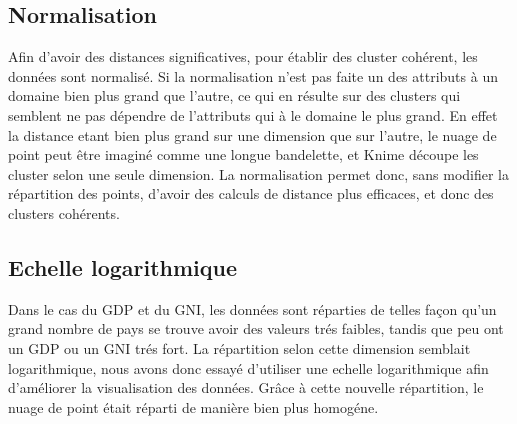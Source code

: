     \subsection{Normalisation}
        Afin d'avoir des distances significatives, pour établir des cluster cohérent, les données sont normalisé.
        Si la normalisation n'est pas faite un des attributs à un domaine bien plus grand que l'autre, ce qui en résulte sur des clusters qui semblent ne pas dépendre de l'attributs qui à le domaine le plus grand.
        En effet la distance etant bien plus grand sur une dimension que sur l'autre, le nuage de point peut être imaginé comme une longue bandelette, et Knime découpe les cluster selon une seule dimension.
        La normalisation permet donc, sans modifier la répartition des points, d'avoir des calculs de distance plus efficaces, et donc des clusters cohérents.
        
    \subsection{Echelle logarithmique}
        Dans le cas du GDP et du GNI, les données sont réparties de telles façon qu'un grand nombre de pays se trouve avoir des valeurs trés faibles, tandis que peu ont un GDP ou un GNI trés fort.
        La répartition selon cette dimension semblait logarithmique, nous avons donc essayé d'utiliser une echelle logarithmique afin d'améliorer la visualisation des données.
        Grâce à cette nouvelle répartition, le nuage de point était réparti de manière bien plus homogéne.
        
